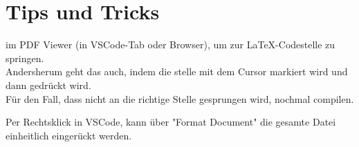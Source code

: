 \chapter{Tips und Tricks}
 im PDF Viewer (in VSCode-Tab oder Browser), um zur \LaTeX-Codestelle zu springen. \\
Andersherum geht das auch, indem die stelle mit dem Cursor markiert wird und dann  gedrückt wird. \\
Für den Fall, dass nicht an die richtige Stelle gesprungen wird, nochmal compilen.

Per Rechtsklick in VSCode, kann über "Format Document" die gesamte Datei einheitlich eingerückt werden.
